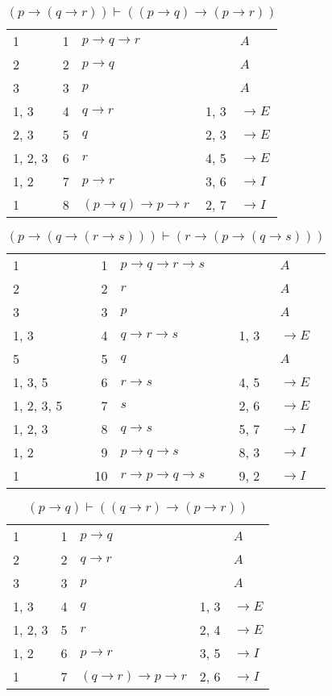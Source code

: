 \documentclass{article}
\begin{document}
\begin{table}[htbp]\caption*{$(p → (q → r)) ⊢ ((p → q) → (p → r))$}\centering\begin{tabular}{lrlll}
{1} & 1 & $p→q→r$ & {} & $A$ \\
{2} & 2 & $p→q$ & {} & $A$ \\
{3} & 3 & $p$ & {} & $A$ \\
{1, 3} & 4 & $q→r$ & {1, 3} & $→E$ \\
{2, 3} & 5 & $q$ & {2, 3} & $→E$ \\
{1, 2, 3} & 6 & $r$ & {4, 5} & $→E$ \\
{1, 2} & 7 & $p→r$ & {3, 6} & $→I$ \\
{1} & 8 & $(p→q)→p→r$ & {2, 7} & $→I$ \\
\end{tabular}
\end{table}
\begin{table}[htbp]\caption*{$(p → (q → (r → s))) ⊢ (r → (p → (q → s)))$}\centering\begin{tabular}{lrlll}
{1} & 1 & $p→q→r→s$ & {} & $A$ \\
{2} & 2 & $r$ & {} & $A$ \\
{3} & 3 & $p$ & {} & $A$ \\
{1, 3} & 4 & $q→r→s$ & {1, 3} & $→E$ \\
{5} & 5 & $q$ & {} & $A$ \\
{1, 3, 5} & 6 & $r→s$ & {4, 5} & $→E$ \\
{1, 2, 3, 5} & 7 & $s$ & {2, 6} & $→E$ \\
{1, 2, 3} & 8 & $q→s$ & {5, 7} & $→I$ \\
{1, 2} & 9 & $p→q→s$ & {8, 3} & $→I$ \\
{1} & 10 & $r→p→q→s$ & {9, 2} & $→I$ \\
\end{tabular}
\end{table}
\begin{table}[htbp]\caption*{$(p → q) ⊢ ((q → r) → (p → r))$}\centering\begin{tabular}{lrlll}
{1} & 1 & $p→q$ & {} & $A$ \\
{2} & 2 & $q→r$ & {} & $A$ \\
{3} & 3 & $p$ & {} & $A$ \\
{1, 3} & 4 & $q$ & {1, 3} & $→E$ \\
{1, 2, 3} & 5 & $r$ & {2, 4} & $→E$ \\
{1, 2} & 6 & $p→r$ & {3, 5} & $→I$ \\
{1} & 7 & $(q→r)→p→r$ & {2, 6} & $→I$ \\
\end{tabular}
\end{table}
\end{document}
